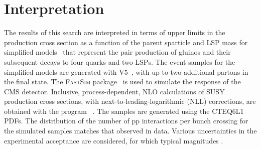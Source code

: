 \clearpage
\section{Interpretation}

The results of this search are interpreted in terms of upper limits in
the production cross section as a function of the parent sparticle and
LSP mass for simplified models~\cite{Alwall:2008ag, Alwall:2008va,
  sms} that represent the pair production of gluinos and their
subsequent decays to four quarks and two LSPs.  The event samples for
the simplified models are generated with \MADGRAPH V5~\cite{madgraph},
with up to two additional partons in the final state.  The
\textsc{FastSim} package~\cite{1742-6596-513-2-022012} is used to
simulate the response of the CMS detector.  Inclusive,
process-dependent, NLO calculations of SUSY production cross sections,
with next-to-leading-logarithmic (NLL) corrections, are obtained with
the program \PROSPINO~\cite{Beenakker:1996ch,
  PhysRevD.80.095004,PhysRevLett.102.111802, PhysRevD.80.095004,
  1126-6708-2009-12-041, doi:10.1142/S0217751X11053560,
  susy-nlo-nll}. The samples are generated using the
CTEQ6L1~\cite{Pumplin:2002vw} PDFs. The distribution of the number of
pp interactions per bunch crossing for the simulated samples matches
that observed in data.  Various uncertainties in the experimental
acceptance are considered, for which typical magnitudes .

